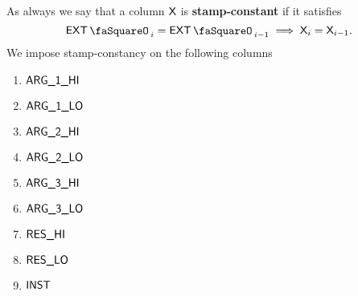 As always we say that a column $\textsf{X}$ is \textbf{stamp-constant} if it satisfies
\[
	\extStamp_{i} = \extStamp_{i - 1}
	\implies
	\col{X}_{i} = \col{X}_{i - 1}.
\]
We impose stamp-constancy on the following columns 
\begin{multicols}{5}
	\begin{enumerate}
		\item $\textsf{ARG}\textsf{\_1}\textsf{\_HI}$
		\item $\textsf{ARG}\textsf{\_1}\textsf{\_LO}$
		\item $\textsf{ARG}\textsf{\_2}\textsf{\_HI}$
		\item $\textsf{ARG}\textsf{\_2}\textsf{\_LO}$
		\item $\textsf{ARG}\textsf{\_3}\textsf{\_HI}$
		\item $\textsf{ARG}\textsf{\_3}\textsf{\_LO}$
		\item $\textsf{RES}\textsf{\_HI}$
		\item $\textsf{RES}\textsf{\_LO}$
		\item $\textsf{INST}$
	\end{enumerate}
\end{multicols}

